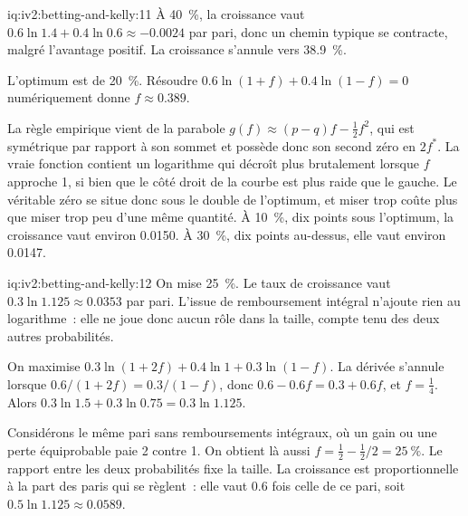 \begin{solution}{iq:iv2:betting-and-kelly:11}
À 40~\%, la croissance vaut $0.6\ln 1.4 + 0.4\ln 0.6 \approx -0.0024$ par pari, donc un chemin typique se contracte, malgré l'avantage positif. La croissance s'annule vers 38.9~\%.

L'optimum est de 20~\%. Résoudre $0.6\ln(1 + f) + 0.4\ln(1 - f) = 0$ numériquement donne $f \approx 0.389$.

La règle empirique vient de la parabole $g(f) \approx (p - q)f - \tfrac12 f^2$, qui est symétrique par rapport à son sommet et possède donc son second zéro en $2f^*$. La vraie fonction contient un logarithme qui décroît plus brutalement lorsque $f$ approche 1, si bien que le côté droit de la courbe est plus raide que le gauche. Le véritable zéro se situe donc sous le double de l'optimum, et miser trop coûte plus que miser trop peu d'une même quantité. À 10~\%, dix points sous l'optimum, la croissance vaut environ 0.0150. À 30~\%, dix points au-dessus, elle vaut environ 0.0147.

\end{solution}

\begin{solution}{iq:iv2:betting-and-kelly:12}
On mise 25~\%. Le taux de croissance vaut $0.3\ln 1.125 \approx 0.0353$ par pari. L'issue de remboursement intégral n'ajoute rien au logarithme~: elle ne joue donc aucun rôle dans la taille, compte tenu des deux autres probabilités.

On maximise $0.3\ln(1 + 2f) + 0.4\ln 1 + 0.3\ln(1 - f)$. La dérivée s'annule lorsque $0.6/(1 + 2f) = 0.3/(1 - f)$, donc $0.6 - 0.6f = 0.3 + 0.6f$, et $f = \tfrac14$. Alors $0.3\ln 1.5 + 0.3\ln 0.75 = 0.3\ln 1.125$.

Considérons le même pari sans remboursements intégraux, où un gain ou une perte équiprobable paie 2 contre 1. On obtient là aussi $f = \tfrac12 - \tfrac12/2 = 25~\%$. Le rapport entre les deux probabilités fixe la taille. La croissance est proportionnelle à la part des paris qui se règlent~: elle vaut $0.6$ fois celle de ce pari, soit $0.5\ln 1.125 \approx 0.0589$.

\end{solution}

